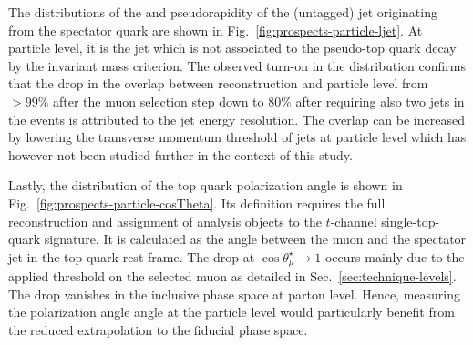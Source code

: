 The distributions of the \pt and pseudorapidity of the (untagged) jet originating from the spectator quark are shown in Fig.~\ref{fig:prospects-particle-ljet}. 
At particle level, it is the jet which is not associated to the pseudo-top quark decay by the invariant mass criterion. 
The observed turn-on in the \pt distribution confirms that the drop in the overlap between reconstruction and particle level from $>99\%$ after the muon selection step down to 80\% after requiring also two jets in the events is attributed to the jet energy resolution. The overlap can be increased by lowering the transverse momentum threshold of jets at particle level which has however not been studied further in the context of this study.


Lastly, the distribution of the top quark polarization angle is shown in Fig.~\ref{fig:prospects-particle-cosTheta}. Its definition requires the full reconstruction and assignment of analysis objects to the $t$-channel single-top-quark signature. It is calculated as the angle between the muon and the spectator jet in the top quark rest-frame. 
The drop at $\cos\theta_\mu^\star\to1$ occurs mainly due to the applied \pt threshold on the selected muon as detailed in Sec.~\ref{sec:technique-levels}. The drop vanishes in the inclusive phase space at parton level. Hence, measuring the polarization angle angle at the particle level would particularly benefit from the reduced extrapolation to the fiducial phase space.

